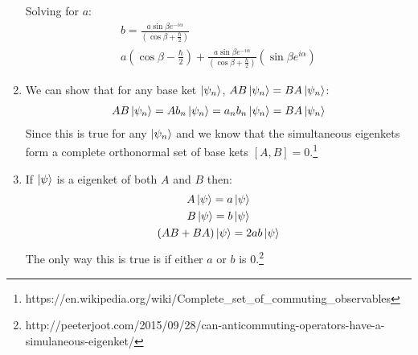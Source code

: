 \documentclass[12pt]{article}
\begin{document}
\begin{enumerate}
        Solving for $a$:
        \begin{gather*}
            b=\frac{a\sin\beta e^{-i\alpha}}{\left(\cos\beta+\frac{\hbar}{2}\right)}\\
            a\left(\cos\beta-\frac{\hbar}{2}\right)+\frac{a\sin\beta e^{-i\alpha}}{\left(\cos\beta+\frac{\hbar}{2}\right)}\left(\sin\beta e^{i\alpha}\right)
        \end{gather*}
        \item[1.17]
        We can show that for any base ket $\ket{\psi_n}$, $AB\ket{\psi_n}=BA\ket{\psi_n}$:
        \begin{gather*}
            AB\ket{\psi_n}=Ab_n\ket{\psi_n}=a_n b_n\ket{\psi_n}=BA\ket{\psi_n}
        \end{gather*}
        Since this is true for any $\ket{\psi_n}$ and we know that the simultaneous eigenkets form a complete orthonormal set of base kets $[A, B]=0$.\footnote{https://en.wikipedia.org/wiki/Complete\_set\_of\_commuting\_observables}
        \item[1.18]
        If $\ket{\psi}$ is a eigenket of both $A$ and $B$ then:
        \begin{gather*}
            A\ket{\psi}=a\ket{\psi}\\
            B\ket{\psi}=b\ket{\psi}\\
            (AB+BA)\ket{\psi}=2ab\ket{\psi}
        \end{gather*}
        The only way this is true is if either $a$ or $b$ is 0.\footnote{http://peeterjoot.com/2015/09/28/can-anticommuting-operators-have-a-simulaneous-eigenket/}
    \end{enumerate}
\end{document}
